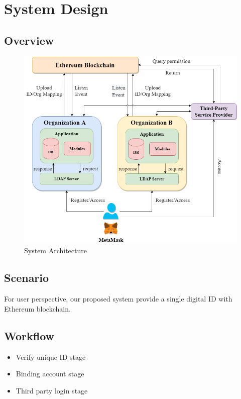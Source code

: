 \chapter{System Design}
\label{chapter:design}

\section{Overview}

\begin{figure}[hb]
    \centering
    \includegraphics[height=!,width=1\linewidth,keepaspectratio=true]{figures/system_architecture.png}
    \caption{{\footnotesize System Architecture}}
    \label{fig:system_architecture}
\end{figure}

\section{Scenario}

    For user perspective, our proposed system provide a single digital ID with Ethereum blockchain.

\section{Workflow}

\begin{itemize}
    \item Verify unique ID stage~\cite{nctuurl}
    \item Binding account stage
    \item Third party login stage
\end{itemize}